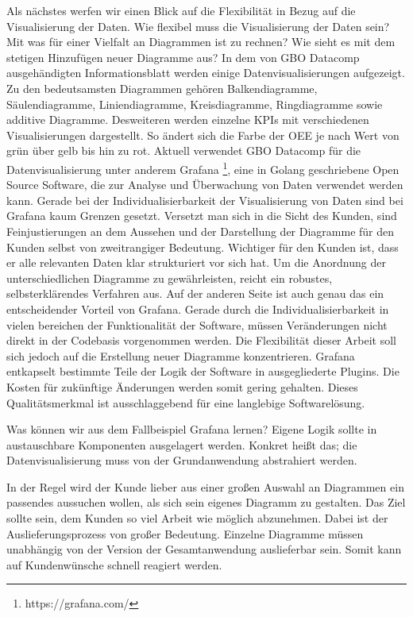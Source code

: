 Als nächstes werfen wir einen Blick auf die Flexibilität in Bezug auf die Visualisierung der Daten. Wie flexibel
muss die Visualisierung der Daten sein? Mit was für einer Vielfalt an Diagrammen ist zu rechnen? Wie sieht es
mit dem stetigen Hinzufügen neuer Diagramme aus? In dem von GBO Datacomp ausgehändigten Informationsblatt
werden einige Datenvisualisierungen aufgezeigt. Zu den bedeutsamsten Diagrammen gehören Balkendiagramme,
Säulendiagramme, Liniendiagramme, Kreisdiagramme, Ringdiagramme sowie additive Diagramme. Desweiteren werden
einzelne KPIs mit verschiedenen Visualisierungen dargestellt. So ändert sich die Farbe der OEE je nach
Wert von grün über gelb bis hin zu rot. Aktuell verwendet GBO Datacomp für die Datenvisualisierung unter
anderem Grafana \footnote{https://grafana.com/}, eine in Golang geschriebene Open Source Software, die zur Analyse
und Überwachung von Daten verwendet werden kann. Gerade bei der Individualisierbarkeit der Visualisierung
von Daten sind bei Grafana kaum Grenzen gesetzt. Versetzt man sich in die Sicht des Kunden, sind Feinjustierungen
an dem Aussehen und der Darstellung der Diagramme für den Kunden selbst von zweitrangiger Bedeutung.
Wichtiger für den Kunden ist, dass er alle relevanten Daten klar strukturiert vor sich hat. Um die Anordnung
der unterschiedlichen Diagramme zu gewährleisten, reicht ein robustes, selbsterklärendes Verfahren aus.
Auf der anderen Seite ist auch genau das ein entscheidender Vorteil von Grafana. Gerade durch die
Individualisierbarkeit in vielen bereichen der Funktionalität der Software, müssen Veränderungen nicht
direkt in der Codebasis vorgenommen werden. Die Flexibilität dieser Arbeit soll sich jedoch auf die
Erstellung neuer Diagramme konzentrieren. Grafana entkapselt bestimmte Teile der Logik der Software
in ausgegliederte Plugins.\cite{GrafanaDeveloperGuide} Die Kosten für zukünftige Änderungen werden
somit gering gehalten. Dieses Qualitätsmerkmal ist ausschlaggebend für eine langlebige Softwarelösung.

Was können wir aus dem Fallbeispiel Grafana lernen? Eigene Logik sollte in austauschbare Komponenten
ausgelagert werden. Konkret heißt das; die Datenvisualisierung muss von der Grundanwendung abstrahiert
werden.

In der Regel wird der Kunde lieber aus einer großen Auswahl an Diagrammen ein passendes aussuchen wollen,
als sich sein eigenes Diagramm zu gestalten. Das Ziel sollte sein, dem Kunden so viel Arbeit wie möglich abzunehmen.
Dabei ist der Auslieferungsprozess von großer Bedeutung. Einzelne Diagramme müssen unabhängig von der Version der
Gesamtanwendung auslieferbar sein. Somit kann auf Kundenwünsche schnell reagiert werden.


